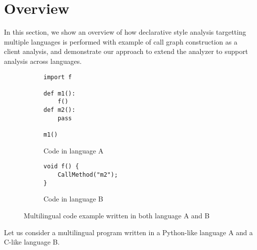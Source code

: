 
\section{Overview}
In this section, we show an overview of how declarative style analysis
targetting multiple languages is performed with example of call graph
construction as a client analysis, and demonstrate our approach to extend the
analyzer to support analysis across languages.



\begin{figure}[t]
  \centering
  \vspace{2mm}
  \begin{subfigure}[t]{0.5\textwidth}
    \begin{lstlisting}[style=mpython]
import f

def m1():
    f()
def m2():
    pass

m1()
    \end{lstlisting}
    \vspace*{-.5em}
    \caption{Code in language A}
    \label{fig:exam:langA}
  \end{subfigure}
  \begin{subfigure}[t]{0.5\textwidth}
    \begin{lstlisting}[style=mcpp,firstnumber=9]
void f() {
    CallMethod("m2");
}
    \end{lstlisting}
    \vspace*{-.5em}
    \caption{Code in language B}
    \label{fig:exam:langB}
  \end{subfigure}
  \vspace*{-.5em}
  \caption{Multilingual code example written in both language A and B}
  \label{fig:exam}
\end{figure}

Let us consider a multilingual program written in a Python-like language A
and a C-like language B.

